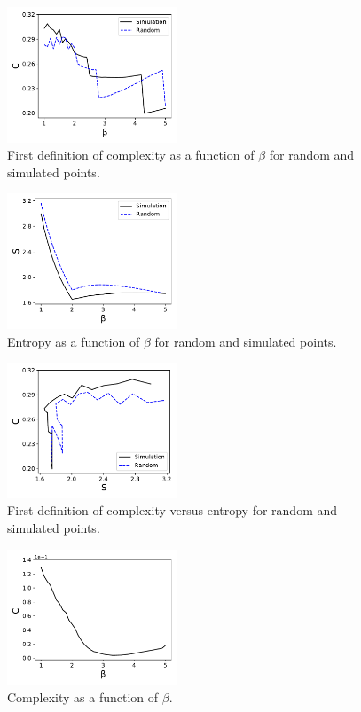\documentclass[fleqn,usenatbib]{mnras}
\begin{document}
\begin{figure}
    \centering
    \includegraphics[width=0.45\textwidth]{cvb_viejo.pdf}
    \caption{First definition of complexity as a function of $\beta$ for random and simulated points.}
    \label{fig:cvb_viejo}
\end{figure}
\begin{figure}
    \centering
    \includegraphics[width=0.45\textwidth]{svb.pdf}
    \caption{Entropy as a function of $\beta$ for random and simulated points.}
    \label{fig:svb}
\end{figure}
\begin{figure}
    \centering
    \includegraphics[width=0.45\textwidth]{cvs_viejo.pdf}
    \caption{First definition of complexity versus entropy for random and simulated points.}
    \label{fig:cvs_viejo}
\end{figure}
\begin{figure}
    \centering
    \includegraphics[width=0.45\textwidth]{cvb_inicial.pdf}
    \caption{Complexity as a function of $\beta$.}
    \label{fig:cvb}
\end{figure}
\end{document}
